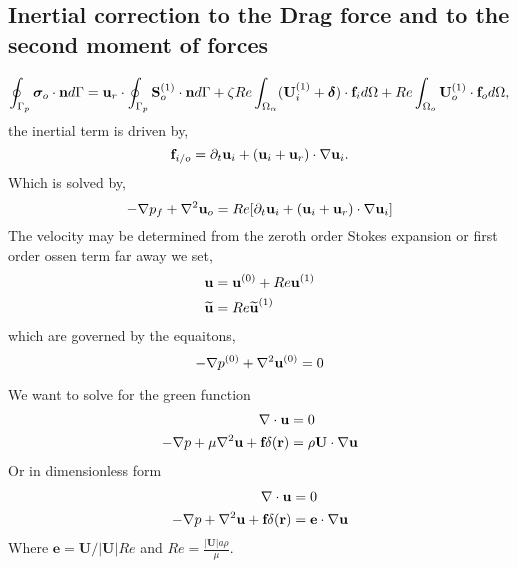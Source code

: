 \subsection{Inertial correction to the Drag force and to the second moment of forces}
\begin{equation}
    \intS[p]{\bm\sigma_{o}\cdot \textbf{n}}
    =
    \textbf{u}_{r}\cdot\intS[p]{ \textbf{S}_{o}^{(1)}\cdot \textbf{n}}
    + \zeta Re \intO{(\textbf{U}_{i}^{(1)} + \bm\delta)\cdot \textbf{f}_{i}}
    + Re\intO[o]{\textbf{U}_{o}^{(1)}\cdot \textbf{f}_{o}},
\end{equation}
the inertial term is driven by,
\begin{equation}
    \textbf{f}_{i/o} =
    \pddt \textbf{u}_{i}
    + (\textbf{u}_{i}+\textbf{u}_r)\cdot \grad \textbf{u}_{i}.
\end{equation}
Which is solved by,
\begin{equation}
    - \grad p_f
    + \grad^2 \textbf{u}_o
    = Re [\pddt \textbf{u}_{i}
    + (\textbf{u}_{i}+\textbf{u}_r)\cdot \grad \textbf{u}_{i}]
\end{equation}
The velocity may be determined from the zeroth order Stokes expansion or first order ossen term far away
we set,
\begin{align}
    \textbf{u} &= \textbf{u}^{(0)} + Re \textbf{u}^{(1)}\\
    \wt{\textbf{u}} &=  Re \wt{\textbf{u}}^{(1)}\\
\end{align}
which are governed by the equaitons,
\begin{equation}
    - \grad p^{(0)} + \grad^2 \textbf{u}^{(0)} = 0
\end{equation}

We want to solve for the green function
\begin{align}
    \div \textbf{u}&= 0\\
    - \grad p
    + \mu \grad^2 \textbf{u}
    + \textbf{f}\delta(\textbf{r})
    &=
    \rho \textbf{U}\cdot \grad \textbf{u}
\end{align}
Or in dimensionless form
\begin{align}
    \div \textbf{u}&= 0\\
    - \grad p
    +  \grad^2 \textbf{u}
    + \textbf{f}\delta(\textbf{r})
    &=
    \textbf{e}\cdot \grad \textbf{u}
\end{align}
Where $\textbf{e} = \textbf{U}/|\textbf{U}| Re$ and $Re = \frac{|\textbf{U}|a \rho}{\mu}$.

